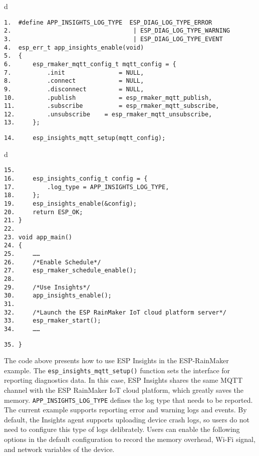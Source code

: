 \documentclass[a4paper,12pt]{book}
\begin{document}
\begin{codebloc}
\begin{tabular}{d}
\vspace{2pt}
\begin{verbatim}
1.  #define APP_INSIGHTS_LOG_TYPE  ESP_DIAG_LOG_TYPE_ERROR 
2.                                  | ESP_DIAG_LOG_TYPE_WARNING 
3.                                  | ESP_DIAG_LOG_TYPE_EVENT
4.  esp_err_t app_insights_enable(void)
5.  {
6.      esp_rmaker_mqtt_config_t mqtt_config = {
7.          .init       		= NULL,
8.          .connect    		= NULL,
9.          .disconnect 		= NULL,
10.         .publish     		= esp_rmaker_mqtt_publish,
11.         .subscribe   		= esp_rmaker_mqtt_subscribe,
12.         .unsubscribe 	= esp_rmaker_mqtt_unsubscribe,
13.     };
\end{verbatim}
\verb|14.     esp_insights_mqtt_setup(mqtt_config);|
\end{tabular}
\end{codebloc}

\begin{codebloc}
\begin{tabular}{d}
\vspace{2pt}
\begin{verbatim}
15.
16.     esp_insights_config_t config = {
17.         .log_type = APP_INSIGHTS_LOG_TYPE,
18.     };
19.     esp_insights_enable(&config);
20.     return ESP_OK;
21. }
22.
23. void app_main()
24. {
25.     ……
26.     /*Enable Schedule*/
27.     esp_rmaker_schedule_enable();
28.
29.     /*Use Insights*/
30.     app_insights_enable();
31.
32.     /*Launch the ESP RainMaker IoT cloud platform server*/
33.     esp_rmaker_start();
34.     ……
\end{verbatim}
\verb|35. }|
\end{tabular}
\end{codebloc}

The code above presents how to use ESP Insights in the ESP-RainMaker example. The \verb|esp_insights_mqtt_setup()| function sets the interface for reporting diagnostics data. In this case, ESP Insights shares the same MQTT channel with the ESP RainMaker IoT cloud platform, which greatly saves the memory. \verb|APP_INSIGHTS_LOG_TYPE| defines the log type that needs to be reported. The current example supports reporting error and warning logs and events. By default, the Insights agent supports uploading device crash logs, so users do not need to configure this type of logs delibrately. Users can enable the following options in the default configuration to record the memory overhead, Wi-Fi signal, and network variables of the device.
\end{document}
